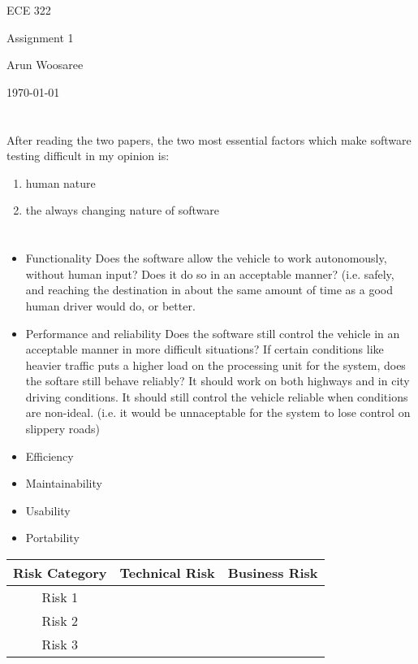 \documentclass[letterpaper]{article}
\begin{document}
\begin{titlepage}
 \begin{center}
  \vspace*{1cm}
  \Huge
  ECE 322
  \vspace{1cm}
  
  Assignment 1
  \vspace{1cm}
  
  Arun Woosaree
  
  \today
  \vfill
 \end{center}
\end{titlepage}

\section{}
After reading the two papers, the two most essential factors which make software testing difficult in my opinion is: 

\begin{enumerate}
	\item human nature
	\item the always changing nature of software
\end{enumerate}

\section{}

\begin{itemize}
	\item Functionality
		Does the software allow the vehicle to work autonomously, without human input? 
		Does it do so in an acceptable manner? 
		(i.e. safely, and reaching the destination in about the same amount of time as a good human driver would do, or better.
	\item Performance and reliability
		Does the software still control the vehicle in an acceptable manner in more difficult situations?
		If certain conditions like heavier traffic puts a higher load on the processing unit for the system, does the softare still behave reliably?
		It should work on both highways and in city driving conditions. 
		It should still control the vehicle reliable when conditions are non-ideal.
		(i.e. it would be unnaceptable for the system to lose control on slippery roads)
	\item Efficiency
	\item Maintainability
	\item Usability
	\item Portability
\end{itemize}

\begin{table}[H]
\centering
\begin{tabular}{c|c|c|}
Risk Category & Technical Risk & Business Risk \\ \hline
Risk 1 &  &  \\ \hline
Risk 2 &  &  \\ \hline
Risk 3 &  &  \\ \hline
\end{tabular}
\end{table}
\end{document}
